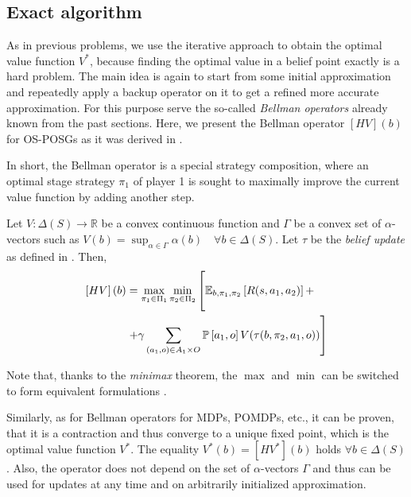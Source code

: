 \documentclass[../main.tex]{subfiles}
\begin{document}
\subsection{Exact algorithm}\label{standard:osposg:exact}
As in previous problems, we use the iterative approach to obtain the optimal value function $V^*$, because finding the optimal value in a belief point exactly is a hard problem.
The main idea is again to start from some initial approximation and repeatedly apply a backup operator on it to get a refined more accurate approximation.
For this purpose serve the so-called \textit{Bellman operators} already known from the past sections.
Here, we present the Bellman operator $[HV](b)$ for OS-POSGs as it was derived in \cite{poposgsthesis}.

In short, the Bellman operator is a special strategy composition, where an optimal stage strategy $\pi_1$ of player 1 is sought to maximally improve the current value function by adding another step.
\begin{definition}
    Let $V: \Delta(S) \to \mathbb{R}$ be a convex continuous function and $\Gamma$ be a convex set of $\alpha$-vectors such as $V(b) = \sup_{\alpha \in \Gamma} \alpha(b) \quad \forall b \in \Delta(S)$.
    Let $\tau$ be the \textit{belief update} as defined in .
    Then,
    \begin{equation}
        \begin{split}
            \left[HV\right](b) &= \max_{\pi_1 \in \Pi_1} \min_{\pi_2 \in \Pi_2} \left[ \vphantom{\sum_{(a_1, o) \in A_1 \times O}} \mathbb{E}_{b, \pi_1, \pi_2}\left[R(s, a_1, a_2)\right] + \right. \\
            & \left. + \gamma \sum_{(a_1, o) \in A_1 \times O}\mathbb{P}\left[a_1, o\right] V(\tau(b, \pi_2, a_1, o))\right]
        \end{split}
    \end{equation}
\end{definition}
Note that, thanks to the \textit{minimax} theorem, the $\max$ and $\min$ can be switched to form equivalent formulations \cite{minimax}.

Similarly, as for Bellman operators for MDPs, POMDPs, etc., it can be proven, that it is a contraction  and thus converge to a unique fixed point, which is the optimal value function $V^*$.
The equality $V^*(b) = \left[HV^*\right](b)$ holds $\forall b \in \Delta(S)$.
Also, the operator does not depend on the set of $\alpha$-vectors $\Gamma$ and thus can be used for updates at any time and on arbitrarily initialized approximation.
\end{document}
